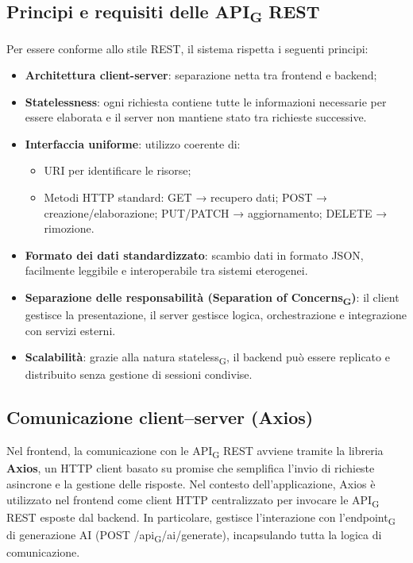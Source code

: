 \documentclass[11pt,a4paper]{article}
\newcommand{\gls}[1]{#1\textsubscript{G}}
\begin{document}
\subsection{Principi e requisiti delle \gls{API} REST}
Per essere conforme allo stile REST, il sistema rispetta i seguenti principi:
\begin{itemize}
\item \textbf{Architettura client-server}: separazione netta tra frontend e backend;
\item \textbf{Statelessness}: ogni richiesta contiene tutte le informazioni necessarie per essere elaborata e il server non mantiene stato tra richieste successive.
\item \textbf{Interfaccia uniforme}: utilizzo coerente di:
    \begin{itemize}[label=\textbullet]
        \item URI per identificare le risorse;
        \item Metodi HTTP standard:
            GET → recupero dati;
            POST → creazione/elaborazione;
            PUT/PATCH → aggiornamento;
            DELETE → rimozione.
\end{itemize}
\item \textbf{Formato dei dati standardizzato}: scambio dati in formato JSON, facilmente leggibile e interoperabile tra sistemi eterogenei.
\item \textbf{Separazione delle responsabilità (\gls{Separation of Concerns})}: il client gestisce la presentazione, il server gestisce logica, orchestrazione e integrazione con servizi esterni.
\item \textbf{Scalabilità}: grazie alla natura \gls{stateless}, il backend può essere replicato e distribuito senza gestione di sessioni condivise.
\end{itemize}

\subsection{Comunicazione client–server (Axios)}
Nel frontend, la comunicazione con le \gls{API} REST avviene tramite la libreria \textbf{Axios}, un HTTP client basato su promise che semplifica l’invio di richieste asincrone e la gestione delle risposte. 
Nel contesto dell’applicazione, Axios è utilizzato nel frontend come client HTTP centralizzato per invocare le \gls{API} REST esposte dal backend. In particolare, gestisce l’interazione con l’\gls{endpoint} di generazione AI (POST /\gls{api}/ai/generate), incapsulando tutta la logica di comunicazione.
\end{document}
